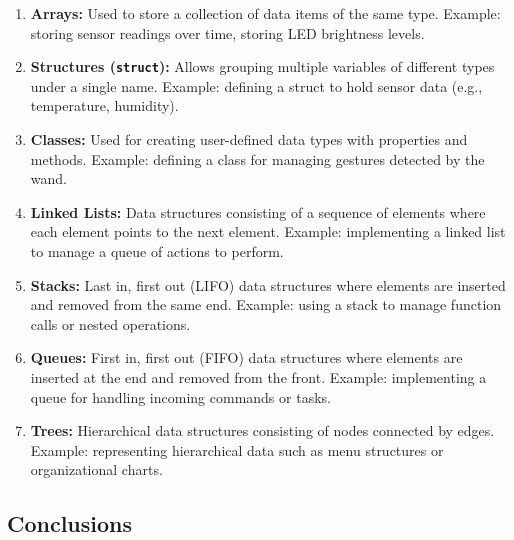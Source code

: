 \begin{enumerate}
    \item \textbf{Arrays:} Used to store a collection of data items of the same type. Example: storing sensor readings over time, storing LED brightness levels.
    
    \item \textbf{Structures (\texttt{struct}):} Allows grouping multiple variables of different types under a single name. Example: defining a struct to hold sensor data (e.g., temperature, humidity).
    
    \item \textbf{Classes:} Used for creating user-defined data types with properties and methods. Example: defining a class for managing gestures detected by the wand.
    
    \item \textbf{Linked Lists:} Data structures consisting of a sequence of elements where each element points to the next element. Example: implementing a linked list to manage a queue of actions to perform.
    
    \item \textbf{Stacks:} Last in, first out (LIFO) data structures where elements are inserted and removed from the same end. Example: using a stack to manage function calls or nested operations.
    
    \item \textbf{Queues:} First in, first out (FIFO) data structures where elements are inserted at the end and removed from the front. Example: implementing a queue for handling incoming commands or tasks.
    
    \item \textbf{Trees:} Hierarchical data structures consisting of nodes connected by edges. Example: representing hierarchical data such as menu structures or organizational charts.
\end{enumerate}



\subsection{Conclusions}
